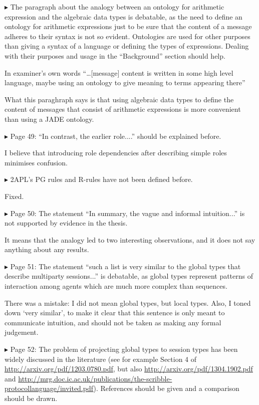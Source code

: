 \documentclass{article}
\newenvironment{them}%
  {\bigskip\noindent\begingroup\color{blue}$\blacktriangleright$\enspace}%
  {\endgroup\par}
\begin{document}
\begin{them}
The paragraph about the analogy between an ontology for arithmetic expression
and the algebraic data types is debatable, as the need to define an ontology
for arithmetic expressions just to be sure that the content of a message
adheres to their syntax is not so evident. Ontologies are used for other
purposes than giving a syntax of a language or defining the types of
expressions. Dealing with their purposes and usage in the ``Background'' section
should help.
\end{them}
In examiner's own words ``\ldots [message] content is written in some high
level language, maybe using an ontology to give meaning to terms appearing
there''

What this paraghraph says is that using algebraic data types to define the
content of messages that consist of arithmetic expressions is more convenient
than using a JADE ontology.

\begin{them}
Page 49:
``In contrast, the earlier role....'' should be explained before.
\end{them}
I believe that introducing role dependencies after describing simple roles
minimises confusion.

\begin{them}
2APL's PG rules and R-rules have not been defined before.
\end{them}
Fixed.

\begin{them}
Page 50:
The statement ``In summary, the vague and informal intuition...'' is not
supported by evidence in the thesis.
\end{them}
It means that the analogy led to two interesting observations, and it does not
say anything about any results.

\begin{them}
Page 51:
The statement ``such a list is very similar to the global types that describe
multiparty sessions...'' is debatable, as global types represent patterns of
interaction among agents which are much more complex than sequences.
\end{them}

There was a mistake: I did not mean global types, but local types.
Also, I toned down `very similar',
  to make it clear that this sentence is only meant to communicate intuition,
and should not be taken as making any formal judgement.


\begin{them}
Page 52:
The problem of projecting global types to session types has been widely
discussed in the literature (see for example Section 4 of
\url{http://arxiv.org/pdf/1203.0780.pdf}, but also
\url{http://arxiv.org/pdf/1304.1902.pdf} and
\url{http://mrg.doc.ic.ac.uk/publications/the-scribble-protocollanguage/invited.pdf}).
References should be given and a comparison should be drawn.
\end{them}
\end{document}
